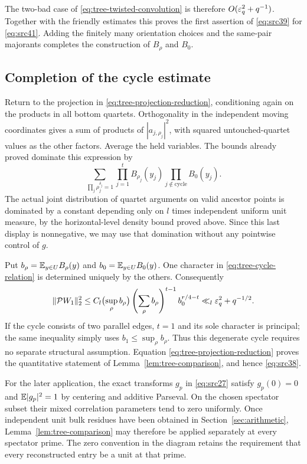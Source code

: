 The two-bad case of \eqref{eq:tree-twisted-convolution} is therefore
$O(\varepsilon_q^2+q^{-1})$.  Together with the friendly estimates this
proves the first assertion of \eqref{eq:src39} for
\eqref{eq:src41}.  Adding the finitely many orientation choices and
the same-pair majorants completes the construction of $B_\rho$ and
$B_0$.

\subsection{Completion of the cycle estimate}

Return to the projection in \eqref{eq:tree-projection-reduction},
conditioning again on the products in all bottom quartets.
Orthogonality in
the independent moving coordinates gives a sum of products of
$|a_{j,\rho_j}|^2$, with squared untouched-quartet values as the other
factors.  Average the held variables.  The bounds already proved
dominate this expression by
\[
 \sum_{\prod_j\rho_j^{\delta_j}=1}
             \prod_{j=1}^t B_{\rho_j}(y_j)
             \prod_{j\notin\mathrm{cycle}}B_0(y_j).
\]
The actual joint distribution of quartet arguments on valid ancestor
points is dominated by a constant depending only on $l$ times
independent uniform unit measure, by the horizontal-level density
bound proved above.  Since this last display is nonnegative, we may
use that domination without any pointwise control of $g$.

Put $b_\rho=\mathbb E_{y\in U}B_\rho(y)$ and
$b_0=\mathbb E_{y\in U}B_0(y)$.  One character in
\eqref{eq:tree-cycle-relation} is determined uniquely by the others.
Consequently
\[
 \|\mathcal PW_1\|_2^2
 \leq C_l\bigl(\sup_\rho b_\rho\bigr)
                 \left(\sum_\rho b_\rho\right)^{t-1}
                 b_0^{r/4-t}
 \ll_l\varepsilon_q^2+q^{-1/2}.
\]
If the cycle consists of two parallel edges, $t=1$ and its sole
character is principal; the same inequality simply uses
$b_1\leq\sup_\rho b_\rho$.  Thus this degenerate cycle requires no
separate structural assumption.  Equation
\eqref{eq:tree-projection-reduction} proves the quantitative statement
of Lemma~\ref{lem:tree-comparison}, and hence \eqref{eq:src38}.

For the later application, the exact transforms $g_p$ in
\eqref{eq:src27} satisfy $g_p(0)=0$ and $\mathbb E|g_p|^2=1$ by centering
and additive Parseval.  On the chosen spectator subset their mixed
correlation parameters tend to zero uniformly.  Once independent
unit bulk residues have been obtained in Section~\ref{sec:arithmetic},
Lemma~\ref{lem:tree-comparison} may therefore be applied separately
at every spectator prime.  The zero convention in the diagram retains
the requirement that every reconstructed entry be a unit at that
prime.
